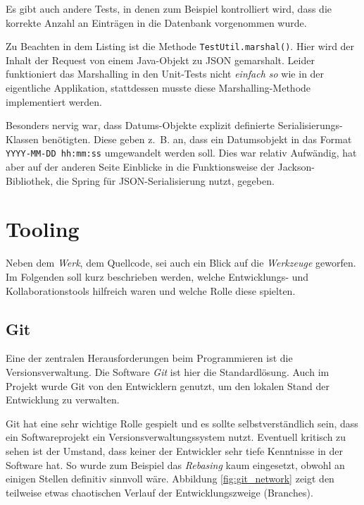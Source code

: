 \documentclass[a4paper, 11pt]{article}
\begin{document}
Es gibt auch andere Tests, in denen zum Beispiel kontrolliert wird, dass die
korrekte Anzahl an Einträgen in die Datenbank vorgenommen wurde.

Zu Beachten in dem Listing ist die Methode \lstinline{TestUtil.marshal()}. Hier
wird der Inhalt der Request von einem Java-Objekt zu JSON gemarshalt. Leider
funktioniert das Marshalling in den Unit-Tests nicht \emph{einfach so} wie in
der eigentliche Applikation, stattdessen musste diese Marshalling-Methode
implementiert werden.

Besonders nervig war, dass Datums-Objekte explizit definierte
Serialisierungs-Klassen benötigten. Diese geben z.~B. an, dass ein Datumsobjekt
in das Format \lstinline{YYYY-MM-DD hh:mm:ss} umgewandelt werden soll. Dies war
relativ Aufwändig, hat aber auf der anderen Seite Einblicke in die
Funktionsweise der Jackson-Bibliothek, die Spring für JSON-Serialisierung
nutzt, gegeben.

\section{Tooling}

Neben dem \emph{Werk}, dem Quellcode, sei auch ein Blick auf die
\emph{Werkzeuge} geworfen. Im Folgenden soll kurz beschrieben werden, welche
Entwicklungs- und Kollaborationstools hilfreich waren und welche Rolle diese
spielten.

\subsection{Git}

Eine der zentralen Herausforderungen beim Programmieren ist die
Versionsverwaltung. Die Software \emph{Git} ist hier die Standardlösung. Auch im Projekt wurde Git von den Entwicklern genutzt, um den lokalen Stand der Entwicklung zu verwalten. 

Git hat eine sehr wichtige Rolle gespielt und es sollte selbstverständlich
sein, dass ein Softwareprojekt ein Versionsverwaltungssystem nutzt. Eventuell
kritisch zu sehen ist der Umstand, dass keiner der Entwickler sehr tiefe
Kenntnisse in der Software hat. So wurde zum Beispiel das \emph{Rebasing} kaum
eingesetzt, obwohl an einigen Stellen definitiv sinnvoll wäre. Abbildung
\ref{fig:git_network} zeigt den teilweise etwas chaotischen Verlauf der
Entwicklungszweige (Branches).
\end{document}
